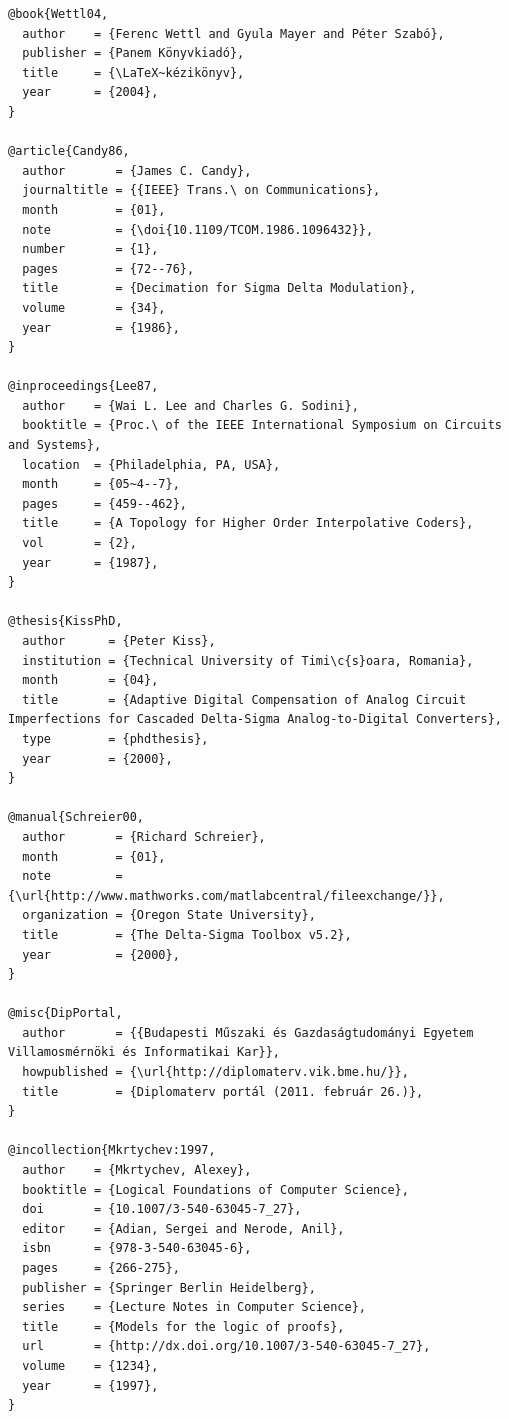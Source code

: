 \begin{lstlisting}[caption=Példa szöveges irodalomjegyzék-adatbázisra Bib\TeX{} használata esetén.,label=lst:Bibtex]
@book{Wettl04,
  author    = {Ferenc Wettl and Gyula Mayer and Péter Szabó},
  publisher = {Panem Könyvkiadó},
  title     = {\LaTeX~kézikönyv},
  year      = {2004},
}

@article{Candy86,
  author       = {James C. Candy},
  journaltitle = {{IEEE} Trans.\ on Communications},
  month        = {01},
  note         = {\doi{10.1109/TCOM.1986.1096432}},
  number       = {1},
  pages        = {72--76},
  title        = {Decimation for Sigma Delta Modulation},
  volume       = {34},
  year         = {1986},
}

@inproceedings{Lee87,
  author    = {Wai L. Lee and Charles G. Sodini},
  booktitle = {Proc.\ of the IEEE International Symposium on Circuits and Systems},
  location  = {Philadelphia, PA, USA},
  month     = {05~4--7},
  pages     = {459--462},
  title     = {A Topology for Higher Order Interpolative Coders},
  vol       = {2},
  year      = {1987},
}

@thesis{KissPhD,
  author      = {Peter Kiss},
  institution = {Technical University of Timi\c{s}oara, Romania},
  month       = {04},
  title       = {Adaptive Digital Compensation of Analog Circuit Imperfections for Cascaded Delta-Sigma Analog-to-Digital Converters},
  type        = {phdthesis},
  year        = {2000},
}

@manual{Schreier00,
  author       = {Richard Schreier},
  month        = {01},
  note         = {\url{http://www.mathworks.com/matlabcentral/fileexchange/}},
  organization = {Oregon State University},
  title        = {The Delta-Sigma Toolbox v5.2},
  year         = {2000},
}

@misc{DipPortal,
  author       = {{Budapesti Műszaki és Gazdaságtudományi Egyetem Villamosmérnöki és Informatikai Kar}},
  howpublished = {\url{http://diplomaterv.vik.bme.hu/}},
  title        = {Diplomaterv portál (2011. február 26.)},
}

@incollection{Mkrtychev:1997,
  author    = {Mkrtychev, Alexey},
  booktitle = {Logical Foundations of Computer Science},
  doi       = {10.1007/3-540-63045-7_27},
  editor    = {Adian, Sergei and Nerode, Anil},
  isbn      = {978-3-540-63045-6},
  pages     = {266-275},
  publisher = {Springer Berlin Heidelberg},
  series    = {Lecture Notes in Computer Science},
  title     = {Models for the logic of proofs},
  url       = {http://dx.doi.org/10.1007/3-540-63045-7_27},
  volume    = {1234},
  year      = {1997},
}
\end{lstlisting}

